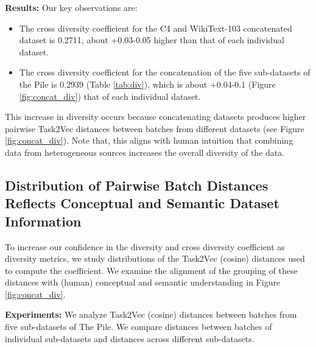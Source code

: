 \textbf{Results:}
Our key observations are:
\begin{itemize}
    \item The cross diversity coefficient for the C4 and WikiText-103 concatenated dataset is 0.2711, about +0.03-0.05 higher than that of each individual dataset.
    \item The cross diversity coefficient for the concatenation of the five sub-datasets of the Pile is 0.2939 (Table \ref{tab:div}), which is about +0.04-0.1 (Figure \ref{fig:concat_div}) that of each individual dataset.
\end{itemize}
This increase in diversity occurs because concatenating datasets produces higher pairwise Task2Vec distances between batches from different datasets (see Figure \ref{fig:concat_div}).
Note that, this aligns with human intuition that combining data from heterogeneous sources increases the overall diversity of the data.

\subsection{Distribution of Pairwise Batch Distances Reflects Conceptual and Semantic Dataset Information}
To increase our confidence in the diversity and cross diversity coefficient as diversity metrics, we study distributions of the Task2Vec (cosine) distances used to compute the coefficient.
We examine the alignment of the grouping of these distances with (human) conceptual and semantic understanding in Figure \ref{fig:concat_div}.

\textbf{Experiments:}
We analyze Task2Vec (cosine) distances between batches from five sub-datasets of The Pile.
We compare distances between batches of individual sub-datasets and distances across different sub-datasets.

